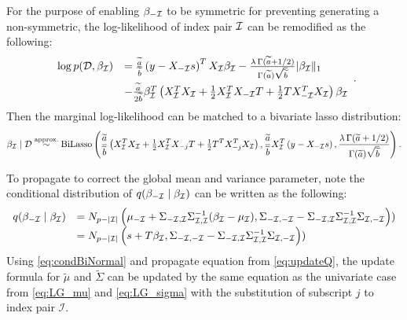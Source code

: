 For the purpose of enabling $\beta_{-{\mathcal I}}$ to be symmetric for preventing generating a non-symmetric, the log-likelihood of index pair ${\mathcal I}$ can be remodified as the following:
\begin{equation}
	\begin{array}{rl} 
		\log p(\mathcal{D},\beta_{\mathcal I}) 
		&  =  \frac{\widetilde{a}}{\widetilde{b}} \left( y - X_{-{\mathcal I}}s \right)^T X_{\mathcal I} \beta_{\mathcal I}
		- \frac{\lambda\,\Gamma(\widetilde{a}+1/2)}{\Gamma(\widetilde{a})\sqrt{\widetilde{b}}} |\beta_{\mathcal I}\|_1
		\\ [2ex]
		& 
		- \frac{\widetilde{a}}{2\widetilde{b}} \beta_{\mathcal I}^T \left( X_{\mathcal I}^TX_{\mathcal I} + \tfrac{1}{2}X_{\mathcal I}^TX_{-{\mathcal I}}T 
		+ \tfrac{1}{2}T X_{-{\mathcal I}}^TX_{\mathcal I}
		\right)\beta_{\mathcal I}
		
	\end{array}.
\end{equation}
Then the marginal log-likelihood can be matched to a bivariate lasso distribution:
\begin{equation}
	\beta_{{\mathcal I}}\mid\mathcal{D} 
	\stackrel{\mbox{\scriptsize approx.}}{\sim} 
	\mbox{BiLasso}\left(
	\frac{\widetilde{a}}{\widetilde{b}} \left(X_{\mathcal I}^TX_{\mathcal I} + \tfrac{1}{2}X_{\mathcal I}^TX_{-j}T + \tfrac{1}{2}T^T X_{-j}^T X_{\mathcal I} \right),
	\frac{\widetilde{a}}{\widetilde{b}} X_{\mathcal I}^T\left( y - X_{-{\mathcal I}}s \right),
	\frac{\lambda\,\Gamma(\widetilde{a}+1/2)}{\Gamma(\widetilde{a})\sqrt{\widetilde{b}}} 
	\right).
\end{equation}

To propagate to correct the global mean and variance parameter, note the conditional distribution of $q(\beta_{-{\mathcal I}}\mid\beta_{\mathcal I})$ can be written as the following:
\begin{equation}
	\begin{array}{rl}
		q(\beta_{-{\mathcal I}}\mid\beta_{\mathcal I}) 
		& = N_{p-|{\mathcal I}|}\left( \mu_{-{\mathcal I}} +\Sigma_{-{\mathcal I},{\mathcal I}} \Sigma_{{\mathcal I},{\mathcal I}}^{-1}(\beta_{\mathcal I} - \mu_{\mathcal I}), \Sigma_{-{\mathcal I},-{\mathcal I}} - \Sigma_{-{\mathcal I},{\mathcal I}}\Sigma_{{\mathcal I},{\mathcal I}}^{-1}\Sigma_{{\mathcal I},-{\mathcal I}}  \right)) 
		\\ 
		& = N_{p-|{\mathcal I}|}\left( s  + T \beta_{{\mathcal I}}, \Sigma_{-{\mathcal I},-{\mathcal I}} - \Sigma_{-{\mathcal I},{\mathcal I}}\Sigma_{{\mathcal I},{\mathcal I}}^{-1}\Sigma_{{\mathcal I},-{\mathcal I}}  \right))
	\end{array} 
	\label{eq:condBiNormal}
\end{equation}
Using \autoref{eq:condBiNormal} and propagate equation from \autoref{eq:updateQ}, the update formula for $\tilde{\mu}$ and $\tilde{\Sigma}$ can be updated by the same equation as the univariate case from \autoref{eq:LG_mu} and \autoref{eq:LG_sigma} with the substitution of subscript $j$ to index pair $\mathcal{I}$.

